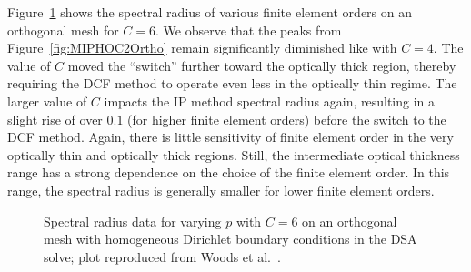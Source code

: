 \documentclass[12pt]{article}
\begin{document}
\FloatBarrier

Figure~\ref{fig:MIPHOC6Ortho} shows the spectral radius of various finite element orders on an orthogonal mesh for $C=6$. We observe that the peaks from Figure~\ref{fig:MIPHOC2Ortho} remain significantly diminished like with $C=4$. The value of $C$ moved the ``switch'' further toward the optically thick region, thereby requiring the DCF method to operate even less in the optically thin regime. The larger value of $C$ impacts the IP method spectral radius again, resulting in a slight rise of over $0.1$ (for higher finite element orders) before the switch to the DCF method. Again, there is little sensitivity of finite element order in the very optically thin and optically thick regions. Still, the intermediate optical thickness range has a strong dependence on the choice of the finite element order. In this range, the spectral radius is generally smaller for lower finite element orders.

\begin{figure}[!hbt]
\centering
{}
\caption{Spectral radius data for varying $p$ with $C=6$ on an orthogonal mesh with homogeneous Dirichlet boundary conditions in the DSA solve; plot reproduced from Woods et al.~\cite{WoodsDSA}.}
\label{fig:MIPHOC6Ortho}
\end{figure}
\end{document}
